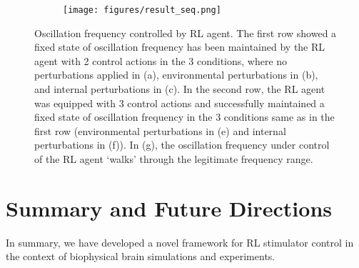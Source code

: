 \documentclass[12pt, a4paper]{article}
\begin{document}
\begin{figure}[t]
\centering
\begin{subfigure}{.3\textwidth}
	\centering
	\texttt{[image: figures/result\_seq.png]} %
	\caption{} %
	\label{fig:seq} %
\end{subfigure}

\caption{Oscillation frequency controlled by RL agent. The first row showed a fixed state of oscillation frequency has been maintained by the RL agent with 2 control actions in the 3 conditions, where no perturbations applied in (a), environmental perturbations in (b), and  internal perturbations in (c). In the second row, the RL agent was equipped with 3 control actions and successfully maintained a fixed state of oscillation frequency in the 3 conditions same as in the first row (environmental perturbations in (e) and internal perturbations in (f)). In (g), the oscillation frequency under control of the RL agent `walks' through the legitimate frequency range.}
\label{fig:control_init}
\end{figure}

\section*{Summary and Future Directions}
In summary, we have developed a novel framework for RL stimulator control in the context of biophysical brain simulations and experiments.



\end{document}
